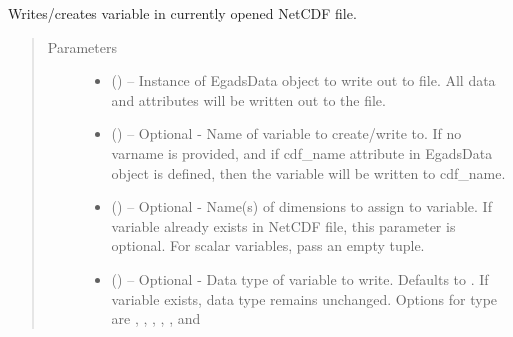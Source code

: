 \documentclass[a4paper,10pt,openany,english]{sphinxmanual}
\begin{document}
\begin{fulllineitems}
\begin{fulllineitems}
\begin{quote}
\begin{description}
\begin{itemize}
\end{itemize}

\end{description}\end{quote}

\end{fulllineitems}


\begin{fulllineitems}
\label{egadsapi:egads.input.netcdf_io.EgadsNetCdf.write_variable}
Writes/creates variable in currently opened NetCDF file.
\begin{quote}\begin{description}
\item[{Parameters}] \leavevmode\begin{itemize}
\item {} 
 ({\hyperref[egadsapi:egads.core.egads_core.EgadsData]{}}) -- Instance of EgadsData object to write out to file.
All data and attributes will be written out to the file.

\item {} 
 () -- Optional - Name of variable to create/write to. If no varname is provided,
and if cdf\_name attribute in EgadsData object is defined, then the variable will be 
written to cdf\_name.

\item {} 
 () -- Optional - Name(s) of dimensions to assign to variable. If variable already exists
in NetCDF file, this parameter is optional. For scalar variables, pass an empty tuple.

\item {} 
 () -- Optional - Data type of variable to write. Defaults to . If variable exists,
data type remains unchanged. Options for type are , , , 
, , and 

\end{itemize}

\end{description}\end{quote}

\end{fulllineitems}


\end{fulllineitems}
\end{document}
